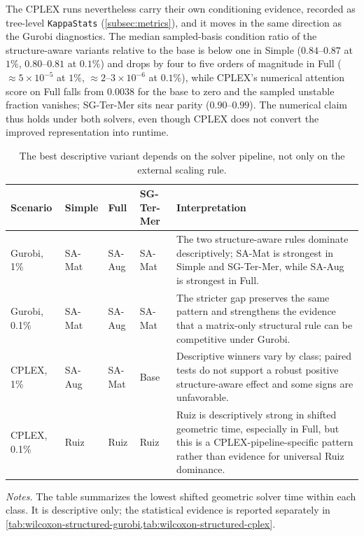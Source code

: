 \documentclass[AMA,Times1COL]{WileyNJDv5} %
\newcommand{\methodBase}{Base}
\newcommand{\methodAug}{SA-Aug}
\newcommand{\methodMat}{SA-Mat}
\newcommand{\methodRuiz}{Ruiz}
\providecommand{\DIFadd}[1]{{\protect\color{blue} \sf #1}} %
\providecommand{\DIFaddbegin}{} %
\providecommand{\DIFaddend}{} %
\providecommand{\DIFdelend}{} %
\begin{document}
\DIFdelend \DIFaddbegin \DIFadd{The CPLEX runs nevertheless carry their own conditioning evidence, recorded as tree-level
\texttt{KappaStats} (\cref{subsec:metrics}), and it moves in the same direction as the Gurobi
diagnostics. The median sampled-basis condition ratio of the structure-aware variants relative
to the base is below one in Simple ($0.84$--$0.87$ at $1\%$, $0.80$--$0.81$ at $0.1\%$) and
drops by four to five orders of magnitude in Full ($\approx 5\times10^{-5}$ at $1\%$,
$\approx 2$--$3\times10^{-6}$ at $0.1\%$), while CPLEX's numerical attention score on Full
falls from $0.0038$ for the base to zero and the sampled unstable fraction vanishes;
SG-Ter-Mer sits near parity ($0.90$--$0.99$). The numerical claim thus holds under both
solvers, even though CPLEX does not convert the improved representation into runtime.
}


\begin{table}[t]
\centering
\caption{The best descriptive variant depends on the solver pipeline, not only on the external scaling rule.}
\label{tab:descriptive-best-by-scenario}
\small
\begin{tabular}{@{}llllp{}@{}}
\toprule
Scenario & Simple & Full & SG-Ter-Mer & Interpretation \\
\midrule
Gurobi, 1\% & \methodMat{} & \methodAug{} & \methodMat{} & The two structure-aware rules dominate descriptively; \methodMat{} is strongest in Simple and SG-Ter-Mer, while \methodAug{} is strongest in Full. \\
Gurobi, 0.1\% & \methodMat{} & \methodAug{} & \methodMat{} & The stricter gap preserves the same pattern and strengthens the evidence that a matrix-only structural rule can be competitive under Gurobi. \\
CPLEX, 1\% & \methodAug{} & \methodMat{} & \methodBase{} & Descriptive winners vary by class; paired tests do not support a robust positive structure-aware effect and some signs are unfavorable. \\
CPLEX, 0.1\% & \methodRuiz{} & \methodRuiz{} & \methodRuiz{} & Ruiz is descriptively strong in shifted geometric time, especially in Full, but this is a CPLEX-pipeline-specific pattern rather than evidence for universal Ruiz dominance. \\
\bottomrule
\end{tabular}
\begin{flushleft}\footnotesize
\emph{Notes.} The table summarizes the lowest shifted geometric solver time within each
class. It is descriptive only; the statistical evidence is reported separately in
\cref{tab:wilcoxon-structured-gurobi,tab:wilcoxon-structured-cplex}.
\end{flushleft}
\end{table}
\DIFaddend 
\end{document}
